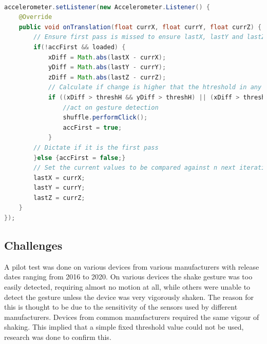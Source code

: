 \documentclass{l4proj}
\begin{document}
\vspace{15mm}

\begin{lstlisting}[language=java, caption={Java code detailing how the shake gesture is detected and how it is acted upon, this particular instance for when detection is made on the Tunes Activity.}, label=lst:Accelerometer]

accelerometer.setListener(new Accelerometer.Listener() {
    @Override
    public void onTranslation(float currX, float currY, float currZ) {
        // Ensure first pass is missed to ensure lastX, lastY and lastZ have values adn songs are available
        if(!accFirst && loaded) {
            xDiff = Math.abs(lastX - currX);
            yDiff = Math.abs(lastY - currY);
            zDiff = Math.abs(lastZ - currZ);
            // Calculate if change is higher that the htreshold in any two axis
            if ((xDiff > threshH && yDiff > threshH) || (xDiff > threshH && zDiff > threshH) || (yDiff > threshH && zDiff > threshH)){
                //act on gesture detection
                shuffle.performClick();
                accFirst = true;
            }
        // Dictate if it is the first pass
        }else {accFirst = false;}
        // Set the current values to be compared against n next iteration
        lastX = currX;
        lastY = currY;
        lastZ = currZ;
    }        
});
\end{lstlisting}

\vspace{15mm}

\subsection{Challenges}
A pilot test was done on various devices from various manufacturers with release dates ranging from 2016 to 2020. On various devices the shake gesture was too easily detected, requiring almost no motion at all, while others were unable to detect the gesture unless the device was very vigorously shaken. The reason for this is thought to be due to the sensitivity of the sensors used by different manufacturers. Devices from common manufacturers required the same vigour of shaking. This implied that a simple fixed threshold value could not be used, research was done to confirm this. 
\end{document}
